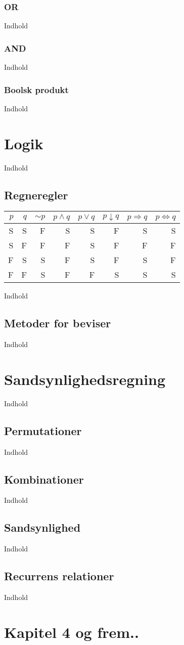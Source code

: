 \documentclass{article}
\begin{document}
    \subsubsection{OR}
      Indhold
    \subsubsection{AND}
      Indhold
    \subsubsection{Boolsk produkt}
      Indhold
\section{Logik}
  Indhold
  \subsection{Regneregler}
    \begin{center}
      \begin{tabular} {|r|r||r|r|r|r|r|r|}
        \hline
        $p$ & $q$  & $\sim{}p$ &  $p\wedge{}q$ &  $p\vee{}q$ &  $p\downarrow{}q$  &  $p\Rightarrow{}q$  &  $p\Leftrightarrow{}q$ \\
        \hline
        \hline
        S&S&F&S&S&F&S&S\\
        \hline
        S&F&F&F&S&F&F&F\\
        \hline
        F&S&S&F&S&F&S&F\\
        \hline
        F&F&S&F&F&S&S&S\\
        \hline
      \end{tabular}
    \end{center}
    Indhold
  \subsection{Metoder for beviser}
    Indhold
\section{Sandsynlighedsregning}
  Indhold
  \subsection{Permutationer}
    Indhold
  \subsection{Kombinationer}
    Indhold
  \subsection{Sandsynlighed}
    Indhold
  \subsection{Recurrens relationer}
    Indhold
\section{Kapitel 4 og frem..}
\end{document}
